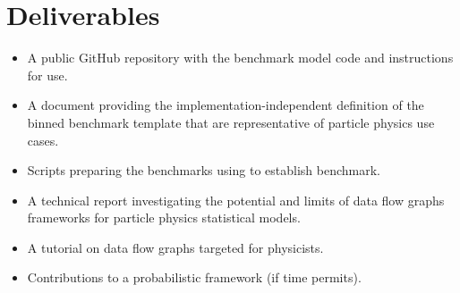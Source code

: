 \section{Deliverables}

\begin{itemize}
	\item A public GitHub repository with the benchmark model code and instructions for use.
	\item A document providing the implementation-independent definition of the binned benchmark template that are representative of particle physics use cases.
	\item Scripts preparing the benchmarks using  to establish  benchmark.
	\item A technical report investigating the potential and limits of data flow graphs frameworks for particle physics statistical models.
	\item A tutorial on data flow graphs targeted for physicists.
	\item Contributions to a probabilistic framework (if time permits).
\end{itemize}

